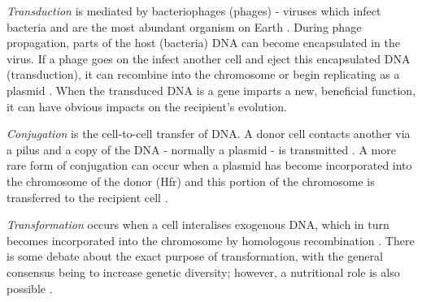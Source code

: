 \textit{Transduction} is mediated by bacteriophages (phages) - viruses which infect bacteria and are the most abundant organism on Earth \cite{mcgrath2007bacteriophage}. During phage propagation, parts of the host (bacteria) DNA can become encapsulated in the virus. If a phage goes on the infect another cell and eject this encapsulated DNA (transduction), it can recombine into the chromosome or begin replicating as a plasmid \cite{Chiang2019}. When the transduced DNA is a gene imparts a new, beneficial function, it can have obvious impacts on the recipient's evolution.

\textit{Conjugation} is the cell-to-cell transfer of DNA. A donor cell contacts another via a pilus and a copy of the DNA - normally a plasmid - is transmitted \cite{Soucy2015}. A more rare form of conjugation can occur when a plasmid has become incorporated into the chromosome of the donor (Hfr) and this portion of the chromosome is transferred to the recipient cell \cite{Redfield2001}.

\textit{Transformation} occurs when a cell interalises exogenous DNA, which in turn becomes incorporated into the chromosome by homologous recombination \cite{Johnston2014}. There is some debate about the exact purpose of transformation, with the general consensus being to increase genetic diversity; however, a nutritional role is also possible \cite{Johnston2014}.

